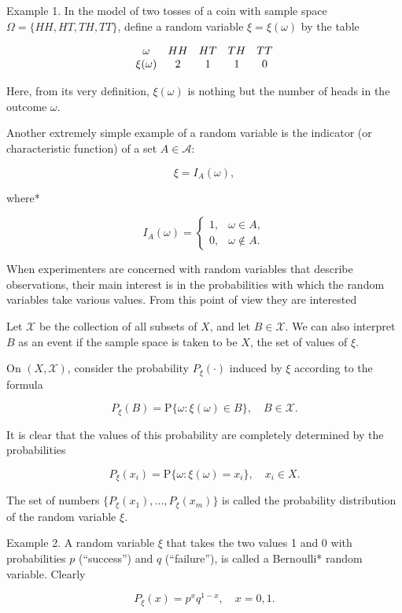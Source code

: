 Example 1. In the model of two tosses of a coin with sample space $\Omega = \{HH, HT, TH, TT\}$, define a random variable $\xi = \xi(\omega)$ by the table

$$
\begin{array}{c c c c c}
\omega & HH & HT & TH & TT \\
\xi(\omega) & 2 & 1 & 1 & 0
\end{array}
$$

Here, from its very definition, $\xi(\omega)$ is nothing but the number of heads in the outcome $\omega$.

Another extremely simple example of a random variable is the indicator (or characteristic function) of a set $A \in \mathcal{A}$:

$$\xi = I_A(\omega),$$

where*

$$I_A(\omega) = \begin{cases} 
1, & \omega \in A, \\
0, & \omega \notin A.
\end{cases}$$

When experimenters are concerned with random variables that describe observations, their main interest is in the probabilities with which the random variables take various values. From this point of view they are interested

Let $\mathcal{X}$ be the collection of all subsets of $X$, and let $B \in \mathcal{X}$. We can also interpret $B$ as an event if the sample space is taken to be $X$, the set of values of $\xi$.

On $(X, \mathcal{X})$, consider the probability $P_{\xi}(\cdot)$ induced by $\xi$ according to the formula

$$P_{\xi}(B) = \text{P}\{\omega : \xi(\omega) \in B\}, \quad B \in \mathcal{X}.$$

It is clear that the values of this probability are completely determined by the probabilities

$$P_{\xi}(x_i) = \text{P}\{\omega : \xi(\omega) = x_i\}, \quad x_i \in X.$$

The set of numbers $\{P_{\xi}(x_1), \ldots, P_{\xi}(x_m)\}$ is called the probability distribution of the random variable $\xi$.

Example 2. A random variable $\xi$ that takes the two values 1 and 0 with probabilities $p$ (“success”) and $q$ (“failure”), is called a Bernoulli* random variable. Clearly

$$P_{\xi}(x) = p^x q^{1-x}, \quad x = 0, 1.$$  

